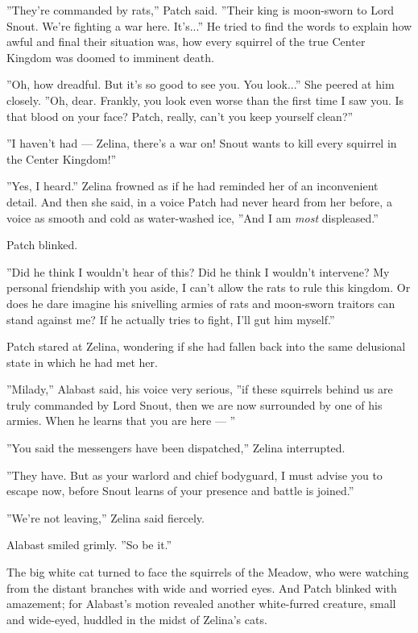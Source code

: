 \documentclass[12pt]{book}
\begin{document}
''They're commanded by rats,'' Patch said. ''Their king is moon-sworn to Lord Snout. We're fighting a war here. It's...'' He tried to find the words to explain how awful and final their situation was, how every squirrel of the true Center Kingdom was doomed to imminent death.

''Oh, how dreadful. But it's so good to see you. You look...'' She peered at him closely. ''Oh, dear. Frankly, you look even worse than the first time I saw you. Is that blood on your face? Patch, really, can't you keep yourself clean?''

''I haven't had ---
Zelina, there's a war on! Snout wants to kill every squirrel in the Center Kingdom!''

''Yes, I heard.'' Zelina frowned as if he had reminded her of an inconvenient detail. And then she said, in a voice Patch had never heard from her before, a voice as smooth and cold as water-washed ice, ''And I am {\it most} displeased.''

Patch blinked.

''Did he think I wouldn't hear of this? Did he think I wouldn't intervene? My personal friendship with you aside, I can't allow the rats to rule this kingdom. Or does he dare imagine his snivelling armies of rats and moon-sworn traitors can stand against me? If he actually tries to fight, I'll gut him myself.''

Patch stared at Zelina, wondering if she had fallen back into the same delusional state in which he had met her.

''Milady,'' Alabast said, his voice very serious, ''if these squirrels behind us are truly commanded by Lord Snout, then we are now surrounded by one of his armies. When he learns that you are here ---
''

''You said the messengers have been dispatched,'' Zelina interrupted.

''They have. But as your warlord and chief bodyguard, I must advise you to escape now, before Snout learns of your presence and battle is joined.''

''We're not leaving,'' Zelina said fiercely.

Alabast smiled grimly. ''So be it.''

The big white cat turned to face the squirrels of the Meadow, who were watching from the distant branches with wide and worried eyes. And Patch blinked with amazement; for Alabast's motion revealed another white-furred creature, small and wide-eyed, huddled in the midst of Zelina's cats.
\end{document}
